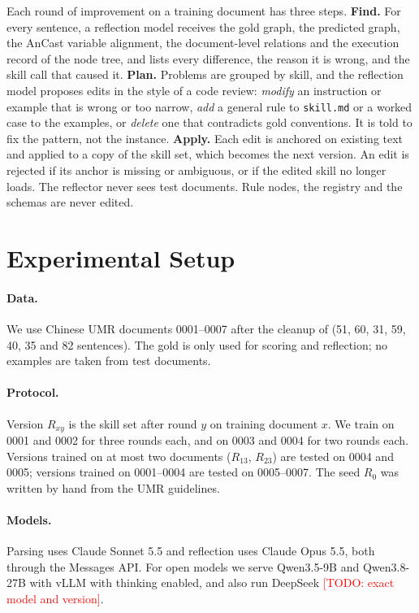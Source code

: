 \documentclass[11pt]{article}
\newcommand{\umr}{\textsc{UMR}\xspace}
\newcommand{\todo}[1]{\textcolor{red}{[TODO: #1]}}
\begin{document}
Each round of improvement on a training document has three steps.
\textbf{Find.} For every sentence, a reflection model receives the gold graph, the predicted graph, the AnCast variable alignment, the document-level relations and the execution record of the node tree, and lists every difference, the reason it is wrong, and the skill call that caused it.
\textbf{Plan.} Problems are grouped by skill, and the reflection model proposes edits in the style of a code review: \emph{modify} an instruction or example that is wrong or too narrow, \emph{add} a general rule to \texttt{skill.md} or a worked case to the examples, or \emph{delete} one that contradicts gold conventions. It is told to fix the pattern, not the instance.
\textbf{Apply.} Each edit is anchored on existing text and applied to a copy of the skill set, which becomes the next version. An edit is rejected if its anchor is missing or ambiguous, or if the edited skill no longer loads. The reflector never sees test documents. Rule nodes, the registry and the schemas are never edited.

\section{Experimental Setup}

\paragraph{Data.}
We use Chinese \umr documents 0001--0007 after the cleanup of \citet{chun2024pipeline} (51, 60, 31, 59, 40, 35 and 82 sentences). The gold is only used for scoring and reflection; no examples are taken from test documents.

\paragraph{Protocol.}
Version $R_{xy}$ is the skill set after round $y$ on training document $x$. We train on 0001 and 0002 for three rounds each, and on 0003 and 0004 for two rounds each. Versions trained on at most two documents ($R_{13}$, $R_{23}$) are tested on 0004 and 0005; versions trained on 0001--0004 are tested on 0005--0007. The seed $R_0$ was written by hand from the \umr guidelines.

\paragraph{Models.}
Parsing uses Claude Sonnet 5.5 and reflection uses Claude Opus 5.5, both through the Messages API. For open models we serve Qwen3.5-9B and Qwen3.8-27B \citep{qwen3} with vLLM with thinking enabled, and also run DeepSeek \todo{exact model and version}.
\end{document}
